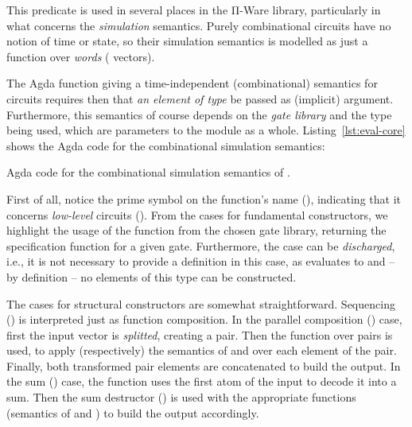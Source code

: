             \begin{center}
            \end{center}

            This predicate is used in several places in the Π-Ware library, particularly in what concerns
            the \emph{simulation} semantics.
            Purely combinational circuits have no notion of time or state, so their simulation semantics
            is modelled as just a function over \emph{words} ( vectors).

            The Agda function giving a time-independent (combinational) semantics for circuits requires then
            that \emph{an element of type } be passed as (implicit) argument.
            Furthermore, this semantics of course depends on the \emph{gate library} and the
             type being used, which are parameters to the  module as a whole.
            Listing~\ref{lst:eval-core} shows the Agda code for the combinational simulation semantics:

            \begin{listing}[ht]
                \caption{Agda code for the combinational simulation semantics of .\label{lst:eval-core}}
            \end{listing}

            First of all, notice the prime symbol on the function's name (),
            indicating that it concerns \emph{low-level} circuits ().
            From the cases for fundamental constructors, we highlight the usage of the 
            function from the chosen gate library, returning the specification function for a given gate.
            Furthermore, the  case can be \emph{discharged}, i.e.,
            it is not necessary to provide a definition in this case,
            as  \AY{(} \AY{)} evaluates to 
            and – by definition – no elements of this type can be constructed.

            The cases for structural constructors are somewhat straightforward.
            Sequencing () is interpreted just as function composition.
            In the parallel composition () case, first the input vector is \emph{splitted}, creating a pair.
            Then the  function over pairs is used, to apply (respectively) the semantics of 
            and  over each element of the pair.
            Finally, both transformed pair elements are concatenated to build the output.
            In the sum () case, the  function uses the first atom of the input
            to decode it into a sum.
            Then the sum destructor () is used with the appropriate functions
            (semantics of  and ) to build the output accordingly.

